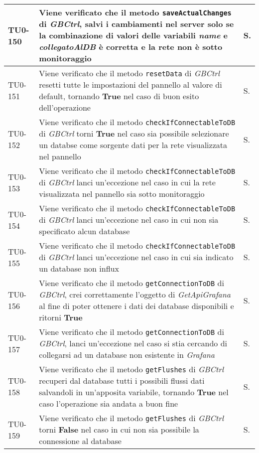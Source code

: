 \begin{longtable}{|C{.15\textwidth}|m{.66\textwidth}|C{.10\textwidth}|}
\hline
TU0-150 & Viene verificato che il metodo \texttt{saveActualChanges} di \textit{GBCtrl}, salvi i cambiamenti nel server solo se la combinazione di valori delle variabili \textit{name} e \textit{collegatoAlDB} è corretta e la rete non è sotto monitoraggio & S.\\
\hline
{}TU0-151 & Viene verificato che il metodo \texttt{resetData} di \textit{GBCtrl} resetti tutte le impostazioni del pannello al valore di default, tornando \textbf{True} nel caso di buon esito dell'operazione & S.\\
\hline
TU0-152 & Viene verificato che il metodo \texttt{checkIfConnectableToDB} di \textit{GBCtrl} torni \textbf{True} nel caso sia possibile selezionare un databse come sorgente dati per la rete visualizzata nel pannello & S.\\
\hline
{}TU0-153 & Viene verificato che il metodo \texttt{checkIfConnectableToDB} di \textit{GBCtrl} lanci un'eccezione nel caso in cui la rete visualizzata nel pannello sia sotto monitoraggio & S.\\
\hline
TU0-154 & Viene verificato che il metodo \texttt{checkIfConnectableToDB} di \textit{GBCtrl} lanci un'eccezione nel caso in cui non sia specificato alcun database & S.\\
\hline
{}TU0-155 & Viene verificato che il metodo \texttt{checkIfConnectableToDB} di \textit{GBCtrl} lanci un'eccezione nel caso in cui sia indicato un database non influx & S.\\
\hline
TU0-156 & Viene verificato che il metodo \texttt{getConnectionToDB} di \textit{GBCtrl}, crei correttamente l'oggetto di \textit{GetApiGrafana} al fine di poter ottenere i dati dei database disponibili e ritorni \textbf{True} & S.\\
\hline
{}TU0-157 & Viene verificato che il metodo \texttt{getConnectionToDB} di \textit{GBCtrl}, lanci un'eccezione nel caso si stia cercando di collegarsi ad un database non esistente in \textit{Grafana} & S.\\
\hline
TU0-158 & Viene verificato che il metodo \texttt{getFlushes} di \textit{GBCtrl} recuperi dal database tutti i possibili flussi dati salvandoli in un'apposita variabile, tornando \textbf{True} nel caso l'operazione sia andata a buon fine & S.\\
\hline
{}TU0-159 & Viene verificato che il metodo \texttt{getFlushes} di \textit{GBCtrl} torni \textbf{False} nel caso in cui non sia possibile la connessione al database & S.\\

\end{longtable}
